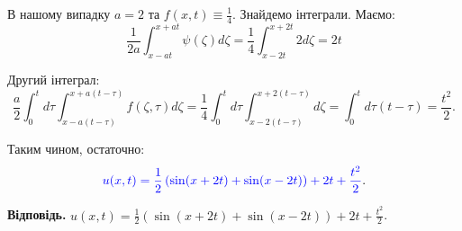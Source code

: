 \documentclass{test_template}
\begin{document}
В нашому випадку $a=2$ та $f(x,t) \equiv \frac{1}{4}$. Знайдемо інтеграли.
Маємо:
\begin{equation*}
    \frac{1}{2a}\int_{x-at}^{x+at}\psi(\zeta)d\zeta = \frac{1}{4}\int_{x-2t}^{x+2t} 2d\zeta = 2t
\end{equation*}

Другий інтеграл:
\begin{equation*}
    \frac{a}{2}\int_0^t d\tau \int_{x-a(t-\tau)}^{x+a(t-\tau)} f(\zeta,\tau)d\zeta = \frac{1}{4} \int_0^t d\tau \int_{x-2(t-\tau)}^{x+2(t-\tau)}d\zeta = \int_0^t d\tau (t-\tau) = \frac{t^2}{2}.
\end{equation*}

Таким чином, остаточно:
\begin{equation*}
    \textcolor{blue}{u(x,t) = \frac{1}{2}\left(\sin(x+2t) + \sin(x-2t)\right) + 2t + \frac{t^2}{2}}.
\end{equation*}

\textbf{Відповідь.} $u(x,t) = \frac{1}{2}\left(\sin(x+2t) + \sin(x-2t)\right) + 2t + \frac{t^2}{2}$.
\end{document}
